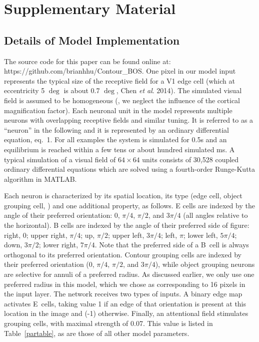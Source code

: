 \section*{Supplementary Material}
\subsection*{Details of Model Implementation}
\label{sec:appendix}
The source code for this paper can be found online at:
https://github.com/brianhhu/Contour\_BOS.
%
 One pixel in our model input represents the typical size of the receptive
field for 
a V1
edge cell (which at eccentricity 5 $\deg$ is about 0.7
$\deg$, Chen {\em et al}. 2014).  The simulated visual field is
assumed to be homogeneous
(\ie, we neglect the influence of the cortical magnification factor).  
Each neuronal unit in the model represents multiple
neurons with overlapping receptive fields and similar tuning.  It is
referred to as a ``neuron'' in the following and it is represented by
an ordinary differential equation, eq.~1.  For all examples the system
is simulated for 0.5s and an equilibrium is reached within a few tens
or about hundred simulated ms.  A typical simulation of a visual field of
$64\times 64$ units consists of 30,528 coupled ordinary differential
equations which are solved using a fourth-order Runge-Kutta  algorithm
in MATLAB.

Each neuron is characterized by its spatial location, its type (edge
cell, object grouping cell, \etc) and one additional property, as
follows. E cells are indexed by the angle of their preferred
orientation: $0$, $\pi/4$, $\pi/2$, and $3\pi/4$
(all angles relative to the horizontal). 
B cells are indexed
by the angle of their preferred side of figure: right, $0$; upper
right, $\pi/4$; up, $\pi/2$; upper left, $3\pi/4$; left, $\pi$; lower
left, $5\pi/4$; down, $3\pi/2$; lower right, $7\pi/4$. 
Note that the preferred side of a 
B~cell
 is always orthogonal to its preferred orientation. Contour
grouping cells are indexed by their preferred orientation ($0$,
$\pi/4$, $\pi/2$, and $3\pi/4$), while object grouping neurons are
selective for annuli of a preferred radius.
As discussed earlier, we only use one preferred radius in this model,
which we chose as corresponding to 16 pixels in the input layer.
The network receives two types
of inputs. A binary edge map activates E~cells, taking value 1 if an
edge of that orientation is present
at this location in the image and (-1)
otherwise. Finally, an attentional field stimulates grouping cells,
with maximal strength of 0.07. This value is listed in
Table~\ref{partable}, as are those of all other model parameters.

